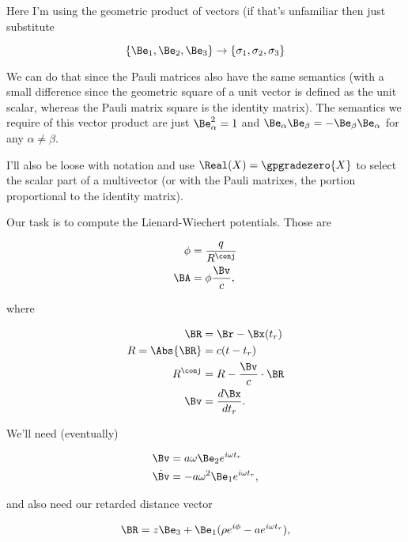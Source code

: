 Here I'm using the geometric product of vectors (if that's unfamiliar then just substitute

\begin{equation}\label{eqn:relativisticElectrodynamicsExamReflection:n}
\{\Be_1, \Be_2, \Be_3\} \rightarrow \{\sigma_1, \sigma_2, \sigma_3\}
\end{equation}

We can do that since the Pauli matrices also have the same semantics (with a small difference since the geometric square of a unit vector is defined as the unit scalar, whereas the Pauli matrix square is the identity matrix).  The semantics we require of this vector product are just $\Be_\alpha^2 = 1$ and $\Be_\alpha \Be_\beta = - \Be_\beta \Be_\alpha$ for any $\alpha \ne \beta$.

I'll also be loose with notation and use $\Real(X) = \gpgradezero{X}$ to select the scalar part of a multivector (or with the Pauli matrixes, the portion proportional to the identity matrix).

Our task is to compute the Lienard-Wiechert potentials.  Those are

\begin{align}\label{eqn:relativisticElectrodynamicsExamReflection:n}
\phi &= \frac{q}{R^\conj} \\
\BA &= \phi \frac{\Bv}{c},
\end{align}

where

\begin{align}\label{eqn:relativisticElectrodynamicsExamReflection:n}
\BR &= \Br - \Bx(t_r) \\
R = \Abs{\BR} &= c (t - t_r) \\
R^\conj &= R - \frac{\Bv}{c} \cdot \BR \\
\Bv &= \frac{d\Bx}{dt_r}.
\end{align}

We'll need (eventually)

\begin{align}\label{eqn:relativisticElectrodynamicsExamReflection:n}
\Bv &= a \omega \Be_2 e^{i \omega t_r} \\
\dot{\Bv} &= -a \omega^2 \Be_1 e^{i \omega t_r},
\end{align}

and also need our retarded distance vector

\begin{equation}\label{eqn:relativisticElectrodynamicsExamReflection:n}
\BR = z \Be_3 + \Be_1 (\rho e^{i \phi} - a e^{i \omega t_r} ),
\end{equation}

